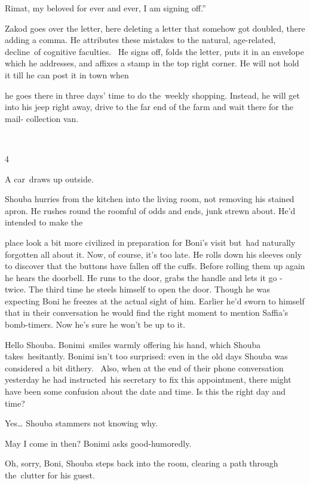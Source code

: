 \documentclass[letterpaper]{article}
\begin{document}
Rimat, my beloved for ever and ever, I am signing off.''

Zakod goes over the letter, here deleting a letter that somehow got doubled, there adding a comma. He attributes these
mistakes to the natural, age-related, decline~of cognitive faculties. \ He signs off, folds the letter, puts it in an
envelope which he addresses, and affixes a stamp in the top right corner. He will not hold it till he can post it in
town when 

he goes there in three days' time to do the~weekly shopping. Instead, he will get into his jeep right away, drive to the
far end of the farm and wait there for the mail- collection van.

~

4

A car~draws up outside.\textcolor[rgb]{0.0,0.4392157,0.7529412}{ }

Shouba hurries from the kitchen into the living room, not removing his stained apron. He rushes round the roomful of
odds and ends, junk strewn about. He'd intended to make the 

place look a bit more civilized in preparation for Boni's visit but~had naturally forgotten all about it. Now, of
course, it's too late. He rolls down his sleeves only to discover that the buttons have fallen off the cuffs. Before
rolling them up again he hears the doorbell. He runs to the door, grabs the handle and lets it go - twice. The third
time he steels himself to open the door. Though he was expecting Boni he freezes at the actual sight of him. Earlier
he'd sworn to himself that in their conversation he would find the right moment to mention Saffia's bomb-timers. Now
he's sure he won't be up to it.

{\textquotedbl}Hello Shouba.{\textquotedbl} Bonimi~smiles warmly offering his hand, which Shouba takes~hesitantly.
Bonimi isn't too surprised: even in the old days Shouba was considered a bit dithery. \ Also, when at the end of their
phone conversation yesterday he had instructed~his secretary to fix this appointment, there might have been some
confusion about the date and time. {\textquotedbl}Is this the right day and time?{\textquotedbl} 

{\textquotedbl}Yes{\dots}{\textquotedbl} Shouba stammers not knowing why.

{\textquotedbl}May I come in then?{\textquotedbl} Bonimi asks good-humoredly.

{\textquotedbl}Oh, sorry, Boni,{\textquotedbl} Shouba steps back into the room, clearing a path through the~clutter for
his guest. 
\end{document}
